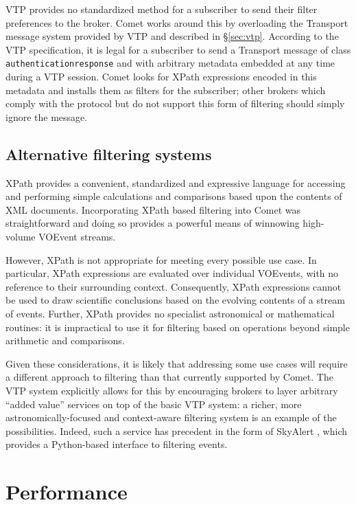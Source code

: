 \documentclass[5p,authoryear]{elsarticle}
\begin{document}
VTP provides no standardized method for a subscriber to send their filter
preferences to the broker. Comet works around this by overloading the
Transport message system provided by VTP and described in \S\ref{sec:vtp}.
According to the VTP specification, it is legal for a subscriber to send a
Transport message of class \texttt{authenticationresponse} and with arbitrary
metadata embedded at any time during a VTP session. Comet looks for XPath
expressions encoded in this metadata and installs them as filters for the
subscriber; other brokers which comply with the protocol but do not support
this form of filtering should simply ignore the message.

\subsection{Alternative filtering systems}

XPath provides a convenient, standardized \citep{Clark:1999} and expressive
language for accessing and performing simple calculations and comparisons
based upon the contents of XML documents. Incorporating XPath based filtering
into Comet was straightforward and doing so provides a powerful means of
winnowing high-volume VOEvent streams.

However, XPath is not appropriate for meeting every possible use case. In
particular, XPath expressions are evaluated over individual VOEvents, with no
reference to their surrounding context. Consequently, XPath expressions cannot
be used to draw scientific conclusions based on the evolving contents of a
stream of events. Further, XPath provides no specialist astronomical or
mathematical routines: it is impractical to use it for filtering based on
operations beyond simple arithmetic and comparisons.

Given these considerations, it is likely that addressing some use cases will
require a different approach to filtering than that currently supported by
Comet. The VTP system explicitly allows for this by encouraging
brokers to layer arbitrary ``added value'' services on top of the basic VTP
system: a richer, more astronomically-focused and context-aware filtering
system is an example of the possibilities. Indeed, such a service has
precedent in the form of SkyAlert \citep{Williams:2009}, which provides a
Python-based interface to filtering events.

\section{Performance}
\label{sec:perf}
\end{document}
